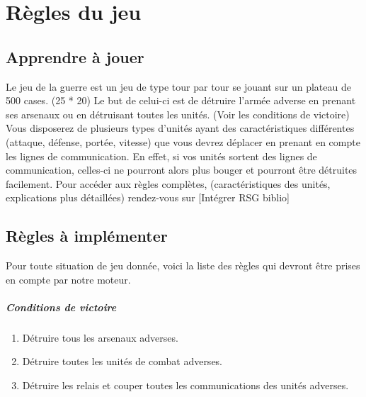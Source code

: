 \chapter{Règles du jeu}

		\section{Apprendre à jouer}
		
		Le jeu de la guerre est un jeu de type tour par tour se jouant sur un plateau de 500 cases. (25 * 20)
		Le but de celui-ci est de détruire l'armée adverse en prenant ses arsenaux ou en détruisant toutes les unités. (Voir les conditions de victoire)
		Vous disposerez de plusieurs types d'unités ayant des caractéristiques différentes (attaque, défense, portée, vitesse) que vous devrez déplacer 
		en prenant en compte les lignes de communication.
		En effet, si vos unités sortent des lignes de communication, celles-ci ne pourront alors plus bouger et pourront être détruites facilement.
		Pour accéder aux règles complètes, (caractéristiques des unités, explications plus détaillées) rendez-vous sur [Intégrer RSG biblio]
		
		\section{Règles à implémenter}
		Pour toute situation de jeu donnée, voici la liste des règles qui devront être prises en compte par notre moteur.

		\paragraph{Conditions de victoire}
		\begin{enumerate}
		\item Détruire tous les arsenaux adverses.
		\item Détruire toutes les unités de combat adverses.
		\item Détruire les relais et couper toutes les communications des unités adverses.
		\end{enumerate}
		
